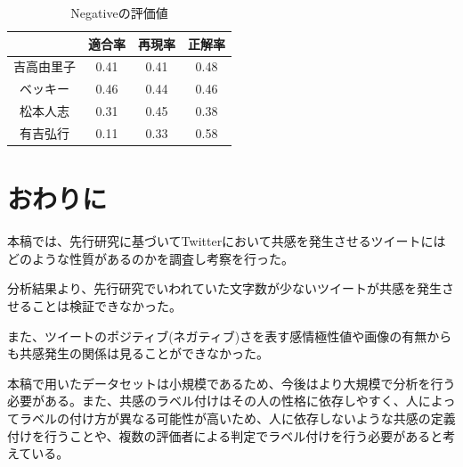 \documentclass[dvipdfmx]{issj}
\begin{document}
\begin{table}[htb]
  \begin{center}
    \caption{Negativeの評価値}
    \begin{tabular}{c|ccc} \hline \hline
& 適合率 & 再現率 & 正解率 \\ \hline \hline
吉高由里子 &0.41&0.41&0.48 \\ \hline
ベッキー &0.46&0.44&0.46\\ \hline
松本人志 &0.31&0.45&0.38\\ \hline
有吉弘行 & 0.11&0.33&0.58 \\ \hline
    \end{tabular}
    \label{tab:tripcode_user}
  \end{center}
\end{table}



\section{おわりに}  %

本稿では、先行研究に基づいてTwitterにおいて共感を発生させるツイートにはどのような性質があるのかを調査し考察を行った。

分析結果より、先行研究でいわれていた文字数が少ないツイートが共感を発生させることは検証できなかった。

また、ツイートのポジティブ(ネガティブ)さを表す感情極性値や画像の有無からも共感発生の関係は見ることができなかった。

本稿で用いたデータセットは小規模であるため、今後はより大規模で分析を行う必要がある。また、共感のラベル付けはその人の性格に依存しやすく、人によってラベルの付け方が異なる可能性が高いため、人に依存しないような共感の定義付けを行うことや、複数の評価者による判定でラベル付けを行う必要があると考えている。
\end{document}
